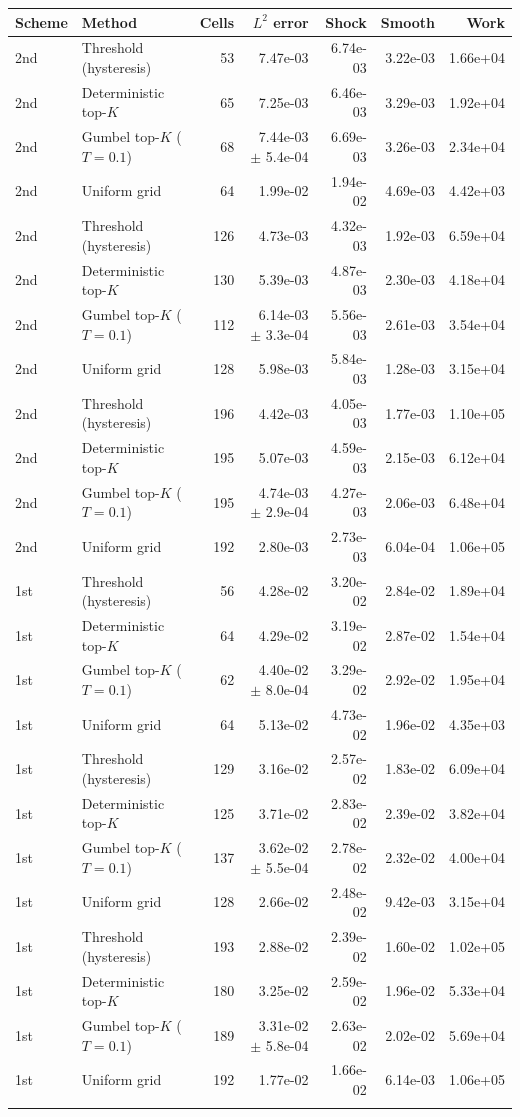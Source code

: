 \begin{tabular}{llrrrrr}
\toprule
Scheme & Method & Cells & $L^2$ error & Shock & Smooth & Work \\
\midrule
2nd & Threshold (hysteresis) & 53 & 7.47e-03 & 6.74e-03 & 3.22e-03 & 1.66e+04 \\
2nd & Deterministic top-$K$ & 65 & 7.25e-03 & 6.46e-03 & 3.29e-03 & 1.92e+04 \\
2nd & Gumbel top-$K$ ($T=0.1$) & 68 & 7.44e-03 $\pm$ 5.4e-04 & 6.69e-03 & 3.26e-03 & 2.34e+04 \\
2nd & Uniform grid & 64 & 1.99e-02 & 1.94e-02 & 4.69e-03 & 4.42e+03 \\
\addlinespace
2nd & Threshold (hysteresis) & 126 & 4.73e-03 & 4.32e-03 & 1.92e-03 & 6.59e+04 \\
2nd & Deterministic top-$K$ & 130 & 5.39e-03 & 4.87e-03 & 2.30e-03 & 4.18e+04 \\
2nd & Gumbel top-$K$ ($T=0.1$) & 112 & 6.14e-03 $\pm$ 3.3e-04 & 5.56e-03 & 2.61e-03 & 3.54e+04 \\
2nd & Uniform grid & 128 & 5.98e-03 & 5.84e-03 & 1.28e-03 & 3.15e+04 \\
\addlinespace
2nd & Threshold (hysteresis) & 196 & 4.42e-03 & 4.05e-03 & 1.77e-03 & 1.10e+05 \\
2nd & Deterministic top-$K$ & 195 & 5.07e-03 & 4.59e-03 & 2.15e-03 & 6.12e+04 \\
2nd & Gumbel top-$K$ ($T=0.1$) & 195 & 4.74e-03 $\pm$ 2.9e-04 & 4.27e-03 & 2.06e-03 & 6.48e+04 \\
2nd & Uniform grid & 192 & 2.80e-03 & 2.73e-03 & 6.04e-04 & 1.06e+05 \\
\addlinespace
1st & Threshold (hysteresis) & 56 & 4.28e-02 & 3.20e-02 & 2.84e-02 & 1.89e+04 \\
1st & Deterministic top-$K$ & 64 & 4.29e-02 & 3.19e-02 & 2.87e-02 & 1.54e+04 \\
1st & Gumbel top-$K$ ($T=0.1$) & 62 & 4.40e-02 $\pm$ 8.0e-04 & 3.29e-02 & 2.92e-02 & 1.95e+04 \\
1st & Uniform grid & 64 & 5.13e-02 & 4.73e-02 & 1.96e-02 & 4.35e+03 \\
\addlinespace
1st & Threshold (hysteresis) & 129 & 3.16e-02 & 2.57e-02 & 1.83e-02 & 6.09e+04 \\
1st & Deterministic top-$K$ & 125 & 3.71e-02 & 2.83e-02 & 2.39e-02 & 3.82e+04 \\
1st & Gumbel top-$K$ ($T=0.1$) & 137 & 3.62e-02 $\pm$ 5.5e-04 & 2.78e-02 & 2.32e-02 & 4.00e+04 \\
1st & Uniform grid & 128 & 2.66e-02 & 2.48e-02 & 9.42e-03 & 3.15e+04 \\
\addlinespace
1st & Threshold (hysteresis) & 193 & 2.88e-02 & 2.39e-02 & 1.60e-02 & 1.02e+05 \\
1st & Deterministic top-$K$ & 180 & 3.25e-02 & 2.59e-02 & 1.96e-02 & 5.33e+04 \\
1st & Gumbel top-$K$ ($T=0.1$) & 189 & 3.31e-02 $\pm$ 5.8e-04 & 2.63e-02 & 2.02e-02 & 5.69e+04 \\
1st & Uniform grid & 192 & 1.77e-02 & 1.66e-02 & 6.14e-03 & 1.06e+05 \\
\addlinespace
\bottomrule
\end{tabular}

